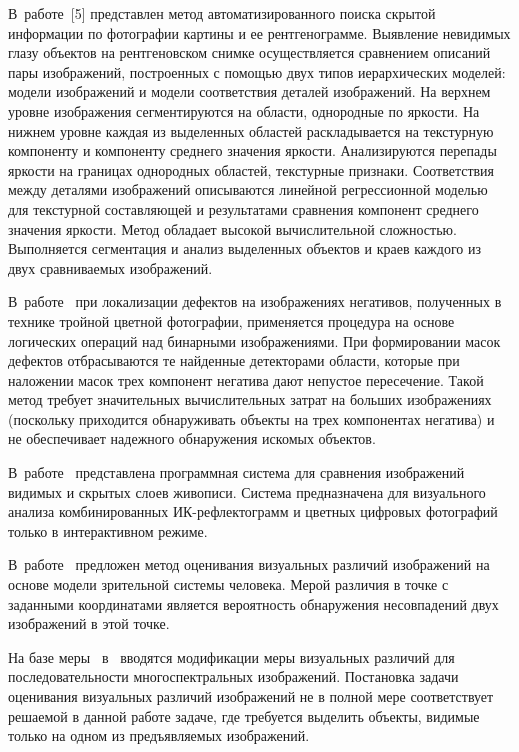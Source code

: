 \begin{multicols}{2}
В~работе~[5] представлен метод 
автоматизированного поиска скрытой информации по фотографии картины и ее 
рентгенограмме. Выявление невидимых глазу объектов на рентгеновском снимке 
осуществляется сравнением описаний пары изображений, построенных с помощью двух 
типов иерархических моделей: модели изображений и модели соответствия деталей 
изображений. На верхнем уровне изображения сегментируются на области, однородные по 
яркости. На нижнем уровне каждая из выделенных областей раскладывается на текстурную 
компоненту и компоненту среднего значения яркости. Анализируются перепады яр\-кости на 
границах однородных областей, текстурные признаки. Соответствия между деталями 
изображений описываются линейной регрессионной моделью для текстурной составляющей 
и результатами сравнения компонент среднего значения яркости. Метод обладает высокой 
вычислительной сложностью. Выполняется сегментация и анализ выделенных объектов и 
краев каждого из двух сравниваемых изображений. 

В~работе~\cite{2mur} при локализации 
дефектов на изоб\-ра\-жениях негативов, полученных в технике тройной цветной фотографии, 
применяется процедура на основе логических операций над бинарными изоб\-ра\-же\-ни\-я\-ми. При 
формировании масок дефектов отбрасываются те найденные детекторами об\-ласти, которые 
при наложении масок трех компонент негатива дают непустое пересечение. Такой метод 
требует значительных вычислительных затрат на больших изображениях (поскольку 
приходится обнаруживать объекты на трех компонентах негатива) и не обеспечивает 
надежного обнаружения искомых объектов. 

В~работе~\cite{6mur} представлена 
программная система для сравнения изображений видимых и скрытых слоев живописи. 
Система предназначена для визуального анализа комбинированных ИК-реф\-лек\-то\-грамм 
и цветных цифровых фотографий только в интерактивном режиме.



  В~работе~\cite{7mur} предложен метод оценивания визуальных различий изображений на 
основе модели зрительной системы человека. Мерой различия в точке с заданными 
координатами является вероятность обнаружения несовпадений двух изоб\-ра\-же\-ний в этой 
точке. 

На базе меры~\cite{7mur} в~\cite{8mur} вводятся модификации меры визуальных 
различий для последо\-ва\-тель\-ности многоспектральных изоб\-ра\-же\-ний. Постановка задачи 
оценивания визуальных различий изображений не в полной мере соответствует решаемой в 
данной работе задаче, где требуется выделить объекты, видимые только на одном из 
предъявляемых изображений.
  

\end{multicols}
